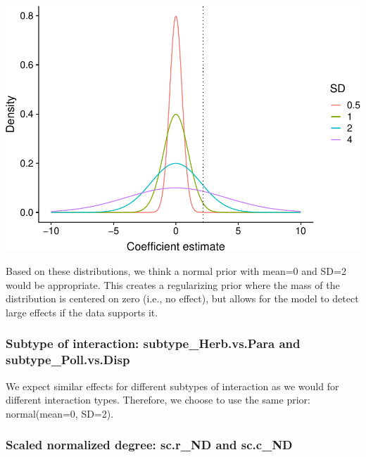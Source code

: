 \documentclass[11pt,]{article}
\let\origfigure\figure
\let\endorigfigure\endfigure
\renewenvironment{figure}[1][2] {
    \expandafter\origfigure\expandafter[H]
} {
    \endorigfigure
}
\begin{document}
\begin{figure}
\centering
\includegraphics{reproduce_analyses_files/figure-latex/simulate prior distribution for type-1.pdf}
\caption{Possible prior distributions for the effect of interaction
type.}
\end{figure}

Based on these distributions, we think a normal prior with mean=0 and
SD=2 would be appropriate. This creates a regularizing prior where the
mass of the distribution is centered on zero (i.e., no effect), but
allows for the model to detect large effects if the data supports it.

\subsubsection{\texorpdfstring{Subtype of interaction:
\textbf{subtype\_Herb.vs.Para} and
\textbf{subtype\_Poll.vs.Disp}}{Subtype of interaction: subtype\_Herb.vs.Para and subtype\_Poll.vs.Disp}}\label{subtype-of-interaction-subtype_herb.vs.para-and-subtype_poll.vs.disp}

We expect similar effects for different subtypes of interaction as we
would for different interaction types. Therefore, we choose to use the
same prior: normal(mean=0, SD=2).

\subsubsection{\texorpdfstring{Scaled normalized degree:
\textbf{sc.r\_ND} and
\textbf{sc.c\_ND}}{Scaled normalized degree: sc.r\_ND and sc.c\_ND}}\label{scaled-normalized-degree-sc.r_nd-and-sc.c_nd}
\end{document}
